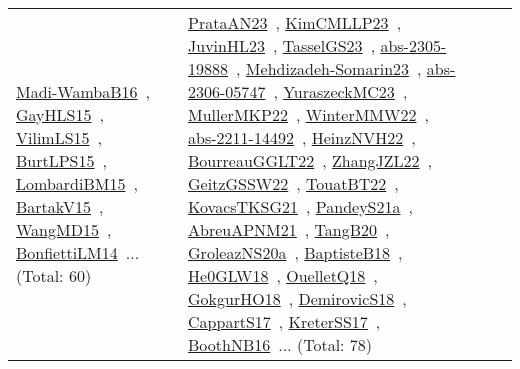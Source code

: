 {\begin{longtable}{lp{3cm}>{\raggedright\arraybackslash}p{6cm}>{\raggedright\arraybackslash}p{6cm}>{\raggedright\arraybackslash}p{8cm}}
\href{works/Madi-WambaB16.pdf}{Madi-WambaB16}~\cite{Madi-WambaB16}, \href{works/GayHLS15.pdf}{GayHLS15}~\cite{GayHLS15}, \href{works/VilimLS15.pdf}{VilimLS15}~\cite{VilimLS15}, \href{works/BurtLPS15.pdf}{BurtLPS15}~\cite{BurtLPS15}, \href{works/LombardiBM15.pdf}{LombardiBM15}~\cite{LombardiBM15}, \href{works/BartakV15.pdf}{BartakV15}~\cite{BartakV15}, \href{works/WangMD15.pdf}{WangMD15}~\cite{WangMD15}, \href{works/BonfiettiLM14.pdf}{BonfiettiLM14}~\cite{BonfiettiLM14}... (Total: 60) & \href{works/PrataAN23.pdf}{PrataAN23}~\cite{PrataAN23}, \href{works/KimCMLLP23.pdf}{KimCMLLP23}~\cite{KimCMLLP23}, \href{works/JuvinHL23.pdf}{JuvinHL23}~\cite{JuvinHL23}, \href{works/TasselGS23.pdf}{TasselGS23}~\cite{TasselGS23}, \href{works/abs-2305-19888.pdf}{abs-2305-19888}~\cite{abs-2305-19888}, \href{works/Mehdizadeh-Somarin23.pdf}{Mehdizadeh-Somarin23}~\cite{Mehdizadeh-Somarin23}, \href{works/abs-2306-05747.pdf}{abs-2306-05747}~\cite{abs-2306-05747}, \href{works/YuraszeckMC23.pdf}{YuraszeckMC23}~\cite{YuraszeckMC23}, \href{works/MullerMKP22.pdf}{MullerMKP22}~\cite{MullerMKP22}, \href{works/WinterMMW22.pdf}{WinterMMW22}~\cite{WinterMMW22}, \href{works/abs-2211-14492.pdf}{abs-2211-14492}~\cite{abs-2211-14492}, \href{works/HeinzNVH22.pdf}{HeinzNVH22}~\cite{HeinzNVH22}, \href{works/BourreauGGLT22.pdf}{BourreauGGLT22}~\cite{BourreauGGLT22}, \href{works/ZhangJZL22.pdf}{ZhangJZL22}~\cite{ZhangJZL22}, \href{works/GeitzGSSW22.pdf}{GeitzGSSW22}~\cite{GeitzGSSW22}, \href{works/TouatBT22.pdf}{TouatBT22}~\cite{TouatBT22}, \href{works/KovacsTKSG21.pdf}{KovacsTKSG21}~\cite{KovacsTKSG21}, \href{works/PandeyS21a.pdf}{PandeyS21a}~\cite{PandeyS21a}, \href{works/AbreuAPNM21.pdf}{AbreuAPNM21}~\cite{AbreuAPNM21}, \href{works/TangB20.pdf}{TangB20}~\cite{TangB20}, \href{works/GroleazNS20a.pdf}{GroleazNS20a}~\cite{GroleazNS20a}, \href{works/BaptisteB18.pdf}{BaptisteB18}~\cite{BaptisteB18}, \href{works/He0GLW18.pdf}{He0GLW18}~\cite{He0GLW18}, \href{works/OuelletQ18.pdf}{OuelletQ18}~\cite{OuelletQ18}, \href{works/GokgurHO18.pdf}{GokgurHO18}~\cite{GokgurHO18}, \href{works/DemirovicS18.pdf}{DemirovicS18}~\cite{DemirovicS18}, \href{works/CappartS17.pdf}{CappartS17}~\cite{CappartS17}, \href{works/KreterSS17.pdf}{KreterSS17}~\cite{KreterSS17}, \href{works/BoothNB16.pdf}{BoothNB16}~\cite{BoothNB16}... (Total: 78)\\

\end{longtable}}
